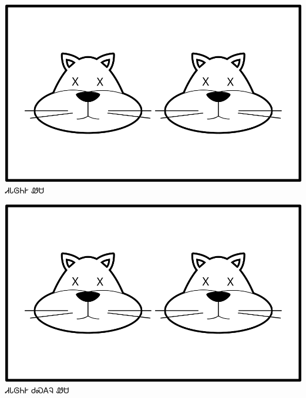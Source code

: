 \documentclass[avery5371]{flashcards}%
\begin{document}
    \begin{flashcard}{
        \includegraphics[width=0.95\columnwidth,height=.51\columnwidth,keepaspectratio]{../artwork/for-colors/wesa-tali-dead}
    }
        \Huge ᏗᏓᎶᏂᎨ ᏪᏌ
    \end{flashcard}
    \begin{flashcard}{
        \includegraphics[width=0.95\columnwidth,height=.51\columnwidth,keepaspectratio]{../artwork/for-colors/wesa-tali-dead}
    }
        \Huge ᏗᏓᎶᏂᎨ ᏧᏍᎪᎸ ᏪᏌ
    \end{flashcard}
\end{document}
